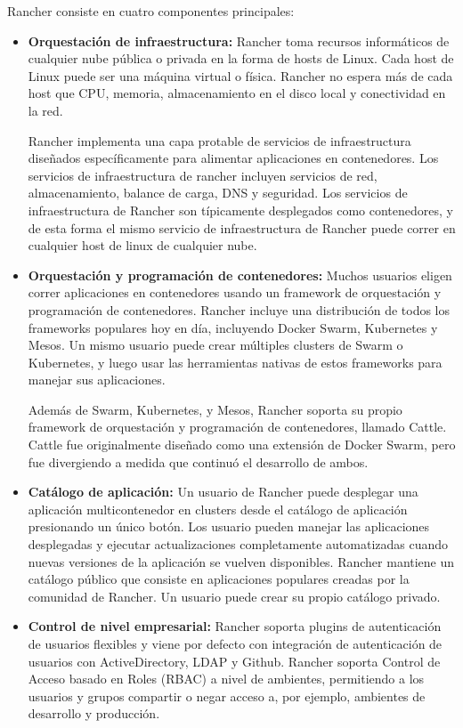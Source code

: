 Rancher consiste en cuatro componentes principales:

\begin{itemize}

  \item \textbf{Orquestación de infraestructura:}
    Rancher toma recursos informáticos de cualquier nube pública o privada en
    la forma de hosts de Linux. Cada host de Linux puede ser una máquina
    virtual o física. Rancher no espera más de cada host que CPU, memoria,
    almacenamiento en el disco local y conectividad en la red.

    Rancher implementa una capa protable de servicios de infraestructura
    diseñados específicamente para alimentar aplicaciones en contenedores. Los
    servicios de infraestructura de rancher incluyen servicios de red,
    almacenamiento, balance de carga, DNS y seguridad. Los servicios de
    infraestructura de Rancher son típicamente desplegados como contenedores, y
    de esta forma el mismo servicio de infraestructura de Rancher puede correr
    en cualquier host de linux de cualquier nube.

  \item \textbf{Orquestación y programación de contenedores:}
    Muchos usuarios eligen correr aplicaciones en contenedores usando un
    framework de orquestación y programación de contenedores. Rancher incluye
    una distribución de todos los frameworks populares hoy en día, incluyendo
    Docker Swarm, Kubernetes y Mesos. Un mismo usuario puede crear múltiples
    clusters de Swarm o Kubernetes, y luego usar las herramientas nativas de
    estos frameworks para manejar sus aplicaciones.

    Además de Swarm, Kubernetes, y Mesos, Rancher soporta su propio framework
    de orquestación y programación de contenedores, llamado Cattle. Cattle fue
    originalmente diseñado como una extensión de Docker Swarm, pero fue
    divergiendo a medida que continuó el desarrollo de ambos.

  \item \textbf{Catálogo de aplicación:}
    Un usuario de Rancher puede desplegar una aplicación multicontenedor en
    clusters desde el catálogo de aplicación presionando un único botón. Los
    usuario pueden manejar las aplicaciones desplegadas y ejecutar
    actualizaciones completamente automatizadas cuando nuevas versiones de la
    aplicación se vuelven disponibles. Rancher mantiene un catálogo público que
    consiste en aplicaciones populares creadas por la comunidad de Rancher. Un
    usuario puede crear su propio catálogo privado.

  \item \textbf{Control de nivel empresarial:}
    Rancher soporta plugins de autenticación de usuarios flexibles y viene por
    defecto con integración de autenticación de usuarios con ActiveDirectory,
    LDAP y Github. Rancher soporta Control de Acceso basado en Roles (RBAC) a
    nivel de ambientes, permitiendo a los usuarios y grupos compartir o negar
    acceso a, por ejemplo, ambientes de desarrollo y producción.

\end{itemize}

\clearpage
